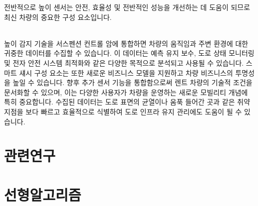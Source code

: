 \documentclass[11pt]{article}
\begin{document}
전반적으로 높이 센서는 안전, 효율성 및 전반적인 성능을 개선하는 데 도움이 되므로 최신 차량의 중요한 구성 요소입니다.


\indent \\높이 감지 기술을 서스펜션 컨트롤 암에 통합하면 차량의 움직임과 주변 환경에 대한 귀중한 데이터를 수집할 수 있습니다. 이 데이터는 예측 유지 보수, 도로 상태 모니터링 및 전자 안전 시스템 최적화와 같은 다양한 목적으로 분석되고 사용될 수 있습니다. 스마트 섀시 구성 요소는 또한 새로운 비즈니스 모델을 지원하고 차량 비즈니스의 투명성을 높일 수 있습니다. 향후 추가 센서 기능을 통합함으로써 렌트 차량의 기술적 조건을 문서화할 수 있으며, 이는 다양한 사용자가 차량을 운영하는 새로운 모빌리티 개념에 특히 중요합니다. 수집된 데이터는 도로 표면의 균열이나 움푹 들어간 곳과 같은 취약 지점을 보다 빠르고 효율적으로 식별하여 도로 인프라 유지 관리에도 도움이 될 수 있습니다.

\section{관련연구}

\section{선형알고리즘}
\end{document}
